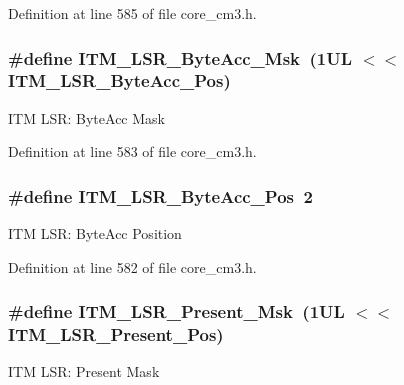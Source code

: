 \-Definition at line 585 of file core\-\_\-cm3.\-h.

\hypertarget{group___c_m_s_i_s___i_t_m_ga91f492b2891bb8b7eac5b58de7b220f4}{
\subsubsection[{\-I\-T\-M\-\_\-\-L\-S\-R\-\_\-\-Byte\-Acc\-\_\-\-Msk}]{\setlength{\rightskip}{0pt plus 5cm}\#define {\bf \-I\-T\-M\-\_\-\-L\-S\-R\-\_\-\-Byte\-Acc\-\_\-\-Msk}~(1\-U\-L $<$$<$ I\-T\-M\-\_\-\-L\-S\-R\-\_\-\-Byte\-Acc\-\_\-\-Pos)}}\label{group___c_m_s_i_s___i_t_m_ga91f492b2891bb8b7eac5b58de7b220f4}
\-I\-T\-M \-L\-S\-R\-: \-Byte\-Acc \-Mask 

\-Definition at line 583 of file core\-\_\-cm3.\-h.

\hypertarget{group___c_m_s_i_s___i_t_m_gabfae3e570edc8759597311ed6dfb478e}{
\subsubsection[{\-I\-T\-M\-\_\-\-L\-S\-R\-\_\-\-Byte\-Acc\-\_\-\-Pos}]{\setlength{\rightskip}{0pt plus 5cm}\#define {\bf \-I\-T\-M\-\_\-\-L\-S\-R\-\_\-\-Byte\-Acc\-\_\-\-Pos}~2}}\label{group___c_m_s_i_s___i_t_m_gabfae3e570edc8759597311ed6dfb478e}
\-I\-T\-M \-L\-S\-R\-: \-Byte\-Acc \-Position 

\-Definition at line 582 of file core\-\_\-cm3.\-h.

\hypertarget{group___c_m_s_i_s___i_t_m_gaa5bc2a7f5f1d69ff819531f5508bb017}{
\subsubsection[{\-I\-T\-M\-\_\-\-L\-S\-R\-\_\-\-Present\-\_\-\-Msk}]{\setlength{\rightskip}{0pt plus 5cm}\#define {\bf \-I\-T\-M\-\_\-\-L\-S\-R\-\_\-\-Present\-\_\-\-Msk}~(1\-U\-L $<$$<$ I\-T\-M\-\_\-\-L\-S\-R\-\_\-\-Present\-\_\-\-Pos)}}\label{group___c_m_s_i_s___i_t_m_gaa5bc2a7f5f1d69ff819531f5508bb017}
\-I\-T\-M \-L\-S\-R\-: \-Present \-Mask 


